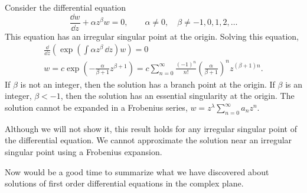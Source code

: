 \begin{Example}
  Consider the differential equation
  \[ 
  \frac{\dd w}{\dd z}  + \alpha z^\beta w = 0, 
  \qquad \alpha \neq 0, \quad \beta \neq -1, 0, 1, 2, \ldots
  \]
  This equation has an irregular singular point at the origin.
  Solving this equation,
  \begin{gather*}
    \frac{\dd}{\dd z} \left(\exp\left(\int \alpha z^\beta\,\dd z \right) w \right)=0\\
    \boxed{ 
      w = c \exp \left(- \frac{\alpha}{\beta+1} z^{\beta+1}\right) = 
      c \sum_{n = 0}^\infty \frac{(-1)^n}{n!} \left( \frac{\alpha}{\beta+1} \right)^n
      z^{(\beta+1)n}. 
      }
  \end{gather*}
  If $\beta$ is not an integer, then the solution has a branch point at the
  origin.  If $\beta$ is an integer, $\beta < -1$, then the solution
  has an essential singularity at the origin.
  The solution cannot be expanded in a Frobenius series,
  $w = z^\lambda \sum_{n=0}^\infty a_n z^n$.  
\end{Example}




Although we will not show it, this result holds for any irregular singular
point of the differential equation.  We cannot approximate 
the solution near an irregular singular point using a Frobenius expansion.

Now would be a good time to summarize what we have discovered about
solutions of first order differential equations in the complex plane.


